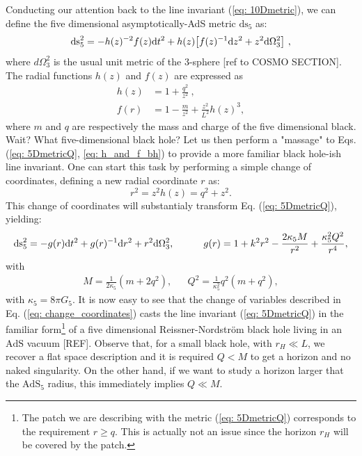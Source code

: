 Conducting our attention back to the line invariant (\ref{eq: 10Dmetric}), we can define the five dimensional asymptotically-AdS metric $\text{ds}_{5}$ as:
\begin{equation}\label{eq: 5DmetricQ}
  \text{ds}_{5}^{2} = - h(z)^{-2} f(z) \text{d} t^{2}
        + h(z) \big[ f(z)^{-1} \text{d} z^{2} + z^{2} \text{d} \Omega_{3}^{2} \big] \ ,
\end{equation}
where $d\Omega_{3}^2$ is the usual unit metric of the 3-sphere [ref to COSMO SECTION]. The radial functions $h(z)$ and $f(z)$ are expressed as
\begin{equation}\label{eq: h_and_f_bh}
    \begin{split}
        h(z)&=1+\frac{q^{2}}{z^{2}} \ , \\
 f(r) &= 1 - \frac{m}{z^{2}} + \frac{z^{2}}{L^{2}} h(z)^{3},
    \end{split}
\end{equation}
where $m$ and $q$ are respectively the mass and charge of the five dimensional black. Wait? What five-dimensional black hole? Let us then perform a "massage" to Eqs. (\ref{eq: 5DmetricQ}, \ref{eq: h_and_f_bh}) to provide a more familiar black hole-ish line invariant. One can start this task by performing a simple change of coordinates, defining a new radial coordinate $r$ as:
\begin{equation}\label{eq: change_coordinates}
    r^{2} = z^{2}h(z) = q^{2} + z^{2} .
\end{equation}
This change of coordinates will substantialy transform Eq. (\ref{eq: 5DmetricQ}), yielding:
\begin{equation}\label{eq: metricargument}
    \text{ds}_{5}^{2} = -g(r) \text{d} t^{2} + g(r)^{-1} \text{d} r^{2}+r^{2} \text{d} \Omega_{3}^{2}, \qquad \quad g(r) = 1 + k^{2}r^{2}- \frac{2\kappa_{5} M}{r^{2}} + \frac{\kappa_{5}^{2} Q^{2}}{r^{4}}, 
\end{equation}
with 
\begin{align}\label{eq: identifications_MQ}
    M = \frac{1}{2\kappa_5}\left(m + 2q^2\right), &&  Q^2 = \frac{1}{\kappa_5^2}q^2(m+q^2),
\end{align}
with $\kappa_5 = 8\pi G_5$. It is now easy to see that the change of variables described in Eq. (\ref{eq: change_coordinates}) casts the line invariant (\ref{eq: 5DmetricQ}) in the familiar form\footnote{The patch we are describing with the metric (\ref{eq: 5DmetricQ}) corresponds to the requirement $r\geqslant q$. This is actually not an issue since the  horizon $r_{H}$ will be covered by the patch.} of a five dimensional Reissner-Nordström black hole living in an $\text{AdS}$ vacuum [REF]. Observe that, for a small black hole, with $r_{H} \ll L$, we recover a flat space description and it is required $Q<M$ to get a horizon and no naked singularity. On the other hand, if we want to study a horizon larger that the $\text{AdS}_{5}$ radius, this immediately implies $Q\ll M$.

